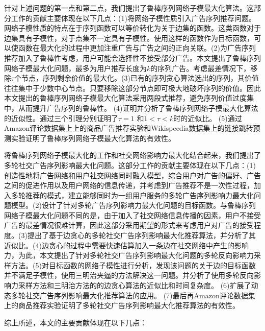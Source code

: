 针对上述问题的第一点和第二点，我们提出了鲁棒序列网络子模最大化算法。这部分工作的贡献主要体现在以下几点：(1)将网络子模性质引入广告序列推荐问题。网络子模性质的特点在于序列函数可以等价转化为关于边集的函数。这类函数对于边集具有子模性，对于点集不一定具有子模性。使用这样的函数作为目标函数，可以使函数在最大化的过程中更加注重广告与广告之间的正向关联。(2)为广告序列推荐加入了鲁棒性考虑，用户可能会选择性不接受部分广告。本文提出了鲁棒序列网络子模最大化问题，最多为用户推荐长度为$k$的序列广告。考虑最差情况下，移除$\tau$个节点，序列剩余价值的最大化。(3)已有的序列贪心算法\cite{tschiatschek2017selecting,mitrovic2018submodularity}选出的序列，其价值往往集中于少数中心节点。只要移除这部分节点即可极大地破坏序列的价值。因此本文提出的鲁棒序列网络子模最大化算法采用两段式推荐，避免序列价值过度集中，从而提升广告序列的鲁棒性。
(4)证明并分析了鲁棒序列网络子模最大化算法的近似性。通过三个引理分别证明了$\tau = 1$ 和$1< \tau < k$时的近似比。
(5)通过Amazon评论数据集上\cite{ni2019justifying}上的商品广告推荐实验和Wikispeedia数据集\cite{west2009wikispeedia}上的链接跳转预测实验证明了鲁棒序列网络子模最大化算法的有效性。

将鲁棒序列网络子模最大化的工作和社交网络影响力最大化结合起来，我们提出了多轮社交广告序列影响最大化问题。这部分工作的贡献主要体现在以下几点：(1)创造性地将广告网络和用户社交网络同时融入模型，综合用户对广告的偏好、广告之间的促进作用以及用户网络的信息传递，并考虑到广告推荐不是一次性过程，加入多轮推荐的模式，建立能够同时为一组用户服务的多轮广告序列影响力最大化问题模型。(2)设计了针对多轮广告序列影响力最大化问题的目标函数。与鲁棒序列网络子模最大化问题不同的是，由于加入了社交网络信息传播的因素，用户不接受广告的最差情况很难计算，因此这部分采用期望的形式来考虑用户对广告的接受程度。(3)提出了基于边贪心的多轮社交广告序列影响最大化推荐算法，并分析了其近似比。(4)边贪心的过程中需要快速估算加入一条边在社交网络中产生的影响力，为此，本文提出了针对多轮社交广告序列影响最大化问题的多轮反向影响力采样方法。(5)对目标函数的网络子模性进行分析，发现该问题的关于边的目标函数并不满足子模性，使用三明治夹逼的方法解决这一问题。并分析了使用多轮反向影响力采样方法和三明治方法的的边贪心算法的近似比和时间复杂度。
(6)扩展了动态多轮社交广告序列影响最大化推荐算法的应用。
(7)最后再Amazon评论数据集\cite{amazon24}上的商品推荐实验证明了多轮社交广告序列影响最大化推荐算法的有效性。

综上所述，本文的主要贡献体现在以下几点：

